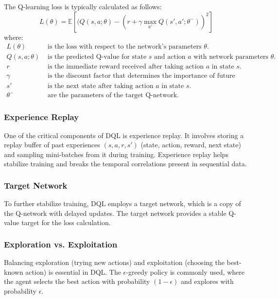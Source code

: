 \documentclass{scrartcl}
\begin{document}
The Q-learning loss is typically calculated as follows:
\[
L(\theta) = \mathbb{E}\left[(Q(s, a;\theta) - (r + \gamma \max_{a'}Q(s', a';\theta^-))^2\right]
\]
where:
\begin{align*}
L(\theta) & \text{ is the loss with respect to the network's parameters }\theta. \\
Q(s, a;\theta) & \text{ is the predicted Q-value for state }s\text{ and action }a\text{ with network parameters }\theta. \\
r & \text{ is the immediate reward received after taking action }a\text{ in state }s. \\
\gamma & \text{ is the discount factor that determines the importance of future rewards.} \\
s' & \text{ is the next state after taking action }a\text{ in state }s. \\
\theta^- & \text{ are the parameters of the target Q-network.}
\end{align*}

\subsubsection{Experience Replay}

One of the critical components of DQL is experience replay. It involves storing a replay buffer of past experiences $(s, a, r, s')$ (state, action, reward, next state) and sampling mini-batches from it during training. Experience replay helps stabilize training and breaks the temporal correlations present in sequential data.

\subsubsection{Target Network}

To further stabilize training, DQL employs a target network, which is a copy of the Q-network with delayed updates. The target network provides a stable Q-value target for the loss calculation.

\subsubsection{Exploration vs. Exploitation}

Balancing exploration (trying new actions) and exploitation (choosing the best-known action) is essential in DQL. The $\epsilon$-greedy policy is commonly used, where the agent selects the best action with probability $(1-\epsilon)$ and explores with probability $\epsilon$.
\end{document}
